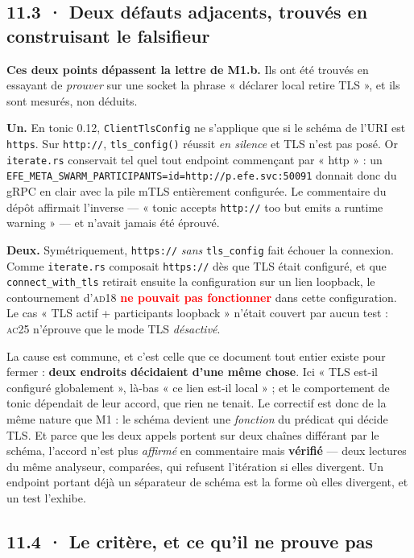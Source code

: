 \documentclass[10pt]{article}
\newcommand{\pire}[1]{\textcolor{red}{\textbf{#1}}}
\newcommand{\code}[1]{\texttt{\small #1}}
\begin{document}
\subsection{11.3 · Deux défauts adjacents, trouvés en construisant le falsifieur}

\begin{alerte}
\textbf{Ces deux points dépassent la lettre de M1.b.} Ils ont été trouvés en essayant de
\emph{prouver} sur une socket la phrase « déclarer local retire TLS », et ils sont mesurés, non
déduits.

\textbf{Un.} En tonic 0.12, \code{ClientTlsConfig} ne s'applique que si le schéma de l'URI est
\code{https}. Sur \code{http://}, \code{tls\_config()} réussit \emph{en silence} et TLS n'est pas
posé. Or \code{iterate.rs} conservait tel quel tout endpoint commençant par « http » : un
\code{EFE\_META\_SWARM\_PARTICIPANTS=id=http://p.efe.svc:50091} donnait donc du gRPC en clair avec
la pile mTLS entièrement configurée. Le commentaire du dépôt affirmait l'inverse --- « tonic accepts
\code{http://} too but emits a runtime warning » --- et n'avait jamais été éprouvé.

\textbf{Deux.} Symétriquement, \code{https://} \emph{sans} \code{tls\_config} fait échouer la
connexion. Comme \code{iterate.rs} composait \code{https://} dès que TLS était configuré, et que
\code{connect\_with\_tls} retirait ensuite la configuration sur un lien loopback, le contournement
d'\textsc{ad18} \pire{ne pouvait pas fonctionner} dans cette configuration. Le cas « TLS actif +
participants loopback » n'était couvert par aucun test : \textsc{ac25} n'éprouve que le mode TLS
\emph{désactivé}.
\end{alerte}

La cause est commune, et c'est celle que ce document tout entier existe pour fermer :
\textbf{deux endroits décidaient d'une même chose}. Ici « TLS est-il configuré globalement », là-bas
« ce lien est-il local » ; et le comportement de tonic dépendait de leur accord, que rien ne tenait.
Le correctif est donc de la même nature que M1 : le schéma devient une \emph{fonction} du prédicat
qui décide TLS. Et parce que les deux appels portent sur deux chaînes différant par le schéma,
l'accord n'est plus \emph{affirmé} en commentaire mais \textbf{vérifié} --- deux lectures du même
analyseur, comparées, qui refusent l'itération si elles divergent. Un endpoint portant déjà un
séparateur de schéma est la forme où elles divergent, et un test l'exhibe.

\subsection{11.4 · Le critère, et ce qu'il ne prouve pas}
\end{document}
